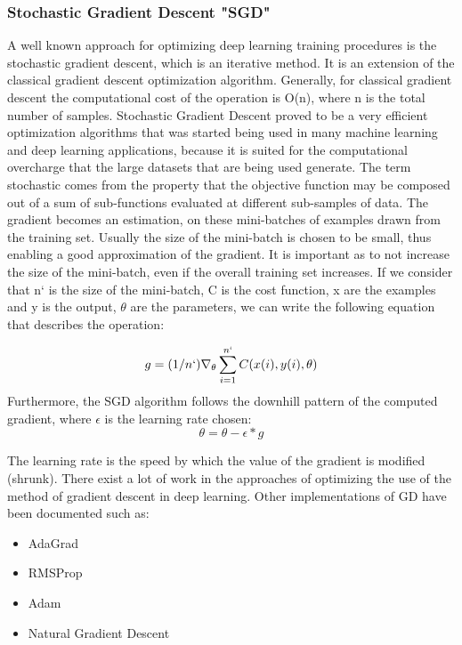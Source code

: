 \documentclass[12pt,a4paper,twoside]{report}
\begin{document}
\subsubsection{Stochastic Gradient Descent "SGD"}
A well known approach for optimizing deep learning training procedures is the stochastic gradient descent, which is an iterative method. It is an extension of the classical gradient descent optimization algorithm. Generally, for classical gradient descent the computational cost of the operation is O(n), where n is the total number of samples. Stochastic Gradient Descent proved to be a very efficient optimization algorithms that was started being used in many machine learning and deep learning applications, because it is suited for the computational overcharge that the large datasets that are being used generate. The term stochastic comes from the property that the objective function may be composed out of a sum of sub-functions evaluated at different sub-samples of data. The gradient becomes an estimation, on these mini-batches of examples drawn from the training set. Usually the size of the mini-batch is chosen to be small, thus enabling a good approximation of the gradient. It is important as to not increase the size of the mini-batch, even if the overall training set increases. If we consider that n` is the size of the mini-batch, C is the cost function, x are the examples and y is the output, $\theta$ are the parameters, we can write the following equation that describes the operation:

\begin{equation}
    g={(1/n`)\nabla_{\theta}\sum_{i=1}^{n`}C(x(i),y(i),\theta)}
\end{equation}
Furthermore, the SGD algorithm follows the downhill pattern of the computed gradient, where $\epsilon$ is the learning rate chosen:
\begin{equation}
     \theta = \theta - \epsilon*g
\end{equation}

The learning rate is the speed by which the value of the gradient is modified (shrunk). There exist a lot of work in the approaches of optimizing the use of the method of gradient descent in deep learning. Other implementations of GD have been documented such as:
\begin{itemize}
    \item AdaGrad 
    \item RMSProp
    \item Adam
    \item Natural Gradient Descent
\end{itemize}
\end{document}
